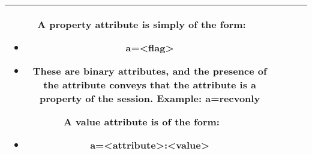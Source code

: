 \begin{longtable}{|c||c||c||>{\raggedright}p{}|}
{\small{A property attribute is simply of the form:}}{\small \par}
\begin{itemize}
\item {\small{a=<flag> }}{\small \par}
\item {\small{These are binary attributes, and the presence of the attribute
conveys that the attribute is a property of the session. Example:
a=recvonly}}{\small \par}
\end{itemize}
{\small{A value attribute is of the form:}}{\small \par}
\begin{itemize}
\item {\small{a=<attribute>:<value>}}\end{itemize}
\tabularnewline
\hline 
\end{longtable}
